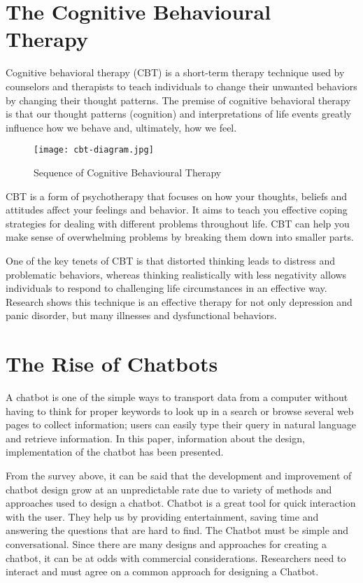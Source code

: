 \pagebreak

\section{The Cognitive Behavioural Therapy}

Cognitive behavioral therapy (CBT) is a short-term therapy technique used by counselors and therapists to teach individuals to change their unwanted behaviors by changing their thought patterns. The premise of cognitive behavioral therapy is that our thought patterns (cognition) and interpretations of life events greatly influence how we behave and, ultimately, how we feel.

\begin{figure}[H]
    \centering
    \texttt{[image: cbt-diagram.jpg]}
    \caption{Sequence of Cognitive Behavioural Therapy}
    \label{fig:cbt-diagram}
\end{figure}

CBT is a form of psychotherapy that focuses on how your thoughts, beliefs and attitudes affect your feelings and behavior. It aims to teach you effective coping strategies for dealing with different problems throughout life. CBT can help you make sense of overwhelming problems by breaking them down into smaller parts.

One of the key tenets of CBT is that distorted thinking leads to distress and problematic behaviors, whereas thinking realistically with less negativity allows individuals to respond to challenging life circumstances in an effective way. Research shows this technique is an effective therapy for not only depression and panic disorder, but many illnesses and dysfunctional behaviors.

\pagebreak

\section{The Rise of Chatbots}

A chatbot is one of the simple ways to transport data from a computer without having to think for proper keywords to look up in a search or browse several web pages to collect information; users can easily type their query in natural language and retrieve information. In this paper, information about the design, implementation of the chatbot has been presented.

From the survey above, it can be said that the development and improvement of chatbot design grow at an unpredictable rate due to variety of methods and approaches used to design a chatbot. Chatbot is a great tool for quick interaction with the user. They help us by providing entertainment, saving time and answering the questions that are hard to find. The Chatbot must be simple and conversational. Since there are many designs and approaches for creating a chatbot, it can be at odds with commercial considerations. Researchers need to interact and must agree on a common approach for designing a Chatbot.

